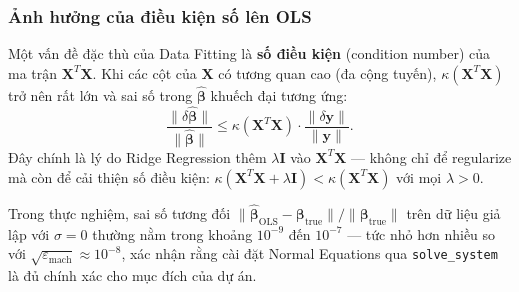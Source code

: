 \subsubsection{Ảnh hưởng của điều kiện số lên OLS}

Một vấn đề đặc thù của Data Fitting là \textbf{số điều kiện} (condition number) của ma trận $\mathbf{X}^T\mathbf{X}$. Khi các cột của $\mathbf{X}$ có tương quan cao (đa cộng tuyến), $\kappa(\mathbf{X}^T\mathbf{X})$ trở nên rất lớn và sai số trong $\hat{\boldsymbol{\beta}}$ khuếch đại tương ứng:
\begin{equation}
    \frac{\|\delta\hat{\boldsymbol{\beta}}\|}{\|\hat{\boldsymbol{\beta}}\|}
    \leq \kappa(\mathbf{X}^T\mathbf{X}) \cdot
    \frac{\|\delta\mathbf{y}\|}{\|\mathbf{y}\|}.
\end{equation}
Đây chính là lý do Ridge Regression thêm $\lambda\mathbf{I}$ vào $\mathbf{X}^T\mathbf{X}$ --- không chỉ để regularize mà còn để cải thiện số điều kiện: $\kappa(\mathbf{X}^T\mathbf{X} + \lambda\mathbf{I}) < \kappa(\mathbf{X}^T\mathbf{X})$ với mọi $\lambda > 0$.

Trong thực nghiệm, sai số tương đối $\|\hat{\boldsymbol{\beta}}_{\mathrm{OLS}} - \boldsymbol{\beta}_{\mathrm{true}}\|/\|\boldsymbol{\beta}_{\mathrm{true}}\|$ trên dữ liệu giả lập với $\sigma = 0$ thường nằm trong khoảng $10^{-9}$ đến $10^{-7}$ --- tức nhỏ hơn nhiều so với $\sqrt{\varepsilon_\text{mach}} \approx 10^{-8}$, xác nhận rằng cài đặt Normal Equations qua \texttt{solve\_system} là đủ chính xác cho mục đích của dự án.